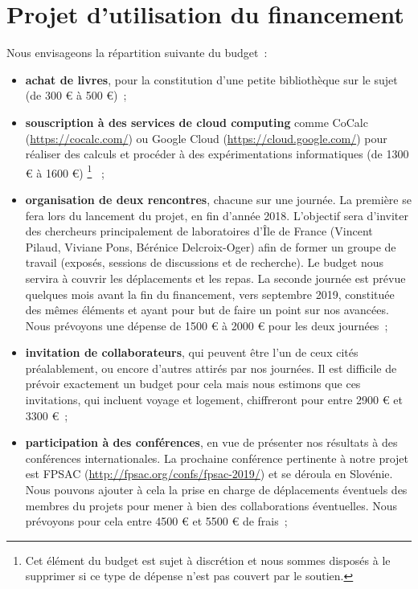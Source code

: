 \documentclass[a4paper, 10pt]{article}
\numberwithin{equation}{subsection}
\begin{document}
\section{Projet d'utilisation du financement}
Nous envisageons la répartition suivante du budget~:
\begin{itemize}
    \item {\bf achat de livres}, pour la constitution d'une petite
    bibliothèque sur le sujet (de 300 € à 500 €)~;
    \smallbreak

    \item {\bf souscription à des services de cloud computing} comme
    {\sc CoCalc} (\url{https://cocalc.com/}) ou {\sc Google Cloud}
    (\url{https://cloud.google.com/}) pour réaliser des calculs
    et procéder à des expérimentations informatiques (de 1300 € à 1600 €)%
    \footnote{Cet élément du budget est sujet à discrétion et nous
    sommes disposés à le supprimer si ce type de dépense n'est pas
    couvert par le soutien.}%
    ~;
    \smallbreak

    \item {\bf organisation de deux rencontres}, chacune sur une
    journée. La
    première se fera lors du lancement du projet, en fin d'année 2018.
    L'objectif sera d'inviter des chercheurs principalement de
    laboratoires d'Île de France (Vincent Pilaud, Viviane Pons,
    Bérénice Delcroix-Oger) afin de former un groupe de travail
    (exposés, sessions de discussions et de recherche). Le budget
    nous servira à couvrir les déplacements et les repas. La
    seconde journée est prévue quelques mois avant la fin du
    financement, vers septembre 2019, constituée des mêmes éléments et
    ayant pour but de faire un point sur nos avancées. Nous
    prévoyons une dépense de 1500 € à 2000 € pour les deux journées~;
    \smallbreak

    \item {\bf invitation de collaborateurs}, qui peuvent être l'un de
    ceux cités préalablement, ou encore d'autres attirés par nos
    journées. Il est difficile de prévoir exactement un budget pour cela
    mais nous estimons que ces invitations, qui incluent voyage et
    logement, chiffreront pour entre 2900 € et 3300 €~;
    \smallbreak

    \item {\bf participation à des conférences}, en vue de présenter
    nos résultats à des conférences internationales. La prochaine
    conférence pertinente à notre projet est FPSAC
    (\url{http://fpsac.org/confs/fpsac-2019/}) et se déroula en Slovénie.
    Nous pouvons ajouter à cela la prise en charge de déplacements
    éventuels des membres du projets pour mener à bien des collaborations
    éventuelles.
    Nous prévoyons pour cela entre 4500 € et 5500 € de frais~;
\end{itemize}
\medbreak
\end{document}
